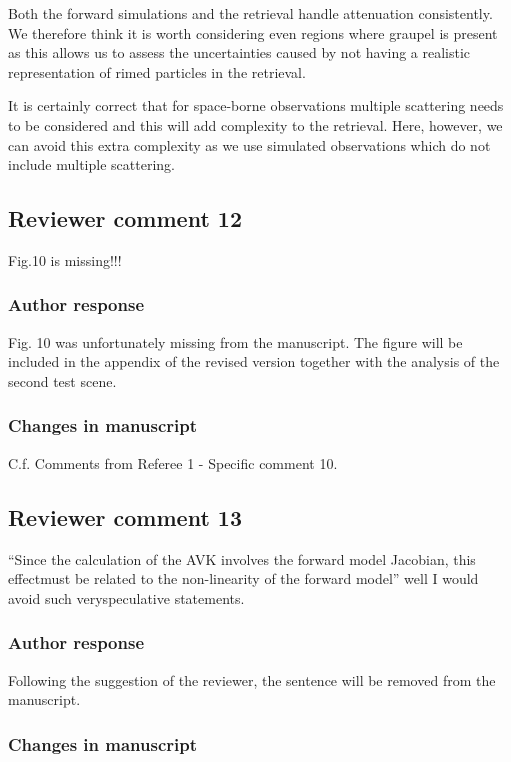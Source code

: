 Both the forward simulations and the retrieval handle attenuation consistently.
We therefore think it is worth considering even regions where graupel is present
as this allows us to assess the uncertainties caused by not having a realistic
representation of rimed particles in the retrieval.

It is certainly correct that for space-borne observations multiple scattering
needs to be considered and this will add complexity to the retrieval. Here,
however, we can avoid this extra complexity as we use simulated observations
which do not include multiple scattering.

\subsection*{Reviewer comment 12}

Fig.10 is missing!!!

\subsubsection*{Author response}

Fig. 10 was unfortunately missing from the manuscript. The figure will be included in the appendix
of the revised version together with the analysis of the second test scene.

\subsubsection*{Changes in manuscript}

C.f. Comments from Referee 1 - Specific comment 10.

\subsection*{Reviewer comment 13}
 “Since the calculation of the AVK involves the forward model Jacobian, this effectmust be related to the non-linearity of the forward model” well I would avoid such veryspeculative statements.

\subsubsection*{Author response}

Following the suggestion of the reviewer, the sentence will be removed from the manuscript.

\subsubsection*{Changes in manuscript}

